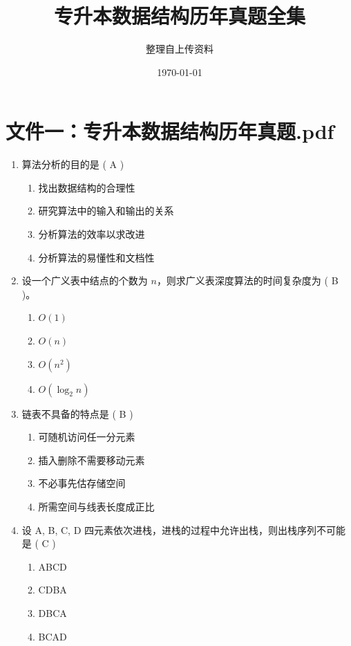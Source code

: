 \documentclass[12pt, a4paper]{article}
\title{\textbf{专升本数据结构历年真题全集}}
\author{整理自上传资料}
\date{\today}
\begin{document}
\maketitle
\tableofcontents
\newpage

\section{文件一：专升本数据结构历年真题.pdf}

\begin{enumerate}[label=\arabic*、]
    \item 算法分析的目的是 ( A )
    \begin{enumerate}
        \item 找出数据结构的合理性
        \item 研究算法中的输入和输出的关系
        \item 分析算法的效率以求改进
        \item 分析算法的易懂性和文档性
    \end{enumerate}

    \item 设一个广义表中结点的个数为 $n$，则求广义表深度算法的时间复杂度为 ( B )。
    \begin{enumerate}
        \item $O(1)$
        \item $O(n)$
        \item $O(n^2)$
        \item $O(\log_2 n)$
    \end{enumerate}

    \item 链表不具备的特点是 ( B )
    \begin{enumerate}
        \item 可随机访问任一分元素
        \item 插入删除不需要移动元素
        \item 不必事先估存储空间
        \item 所需空间与线表长度成正比
    \end{enumerate}

    \item 设 A, B, C, D 四元素依次进栈，进栈的过程中允许出栈，则出栈序列不可能是 ( C )
    \begin{enumerate}
        \item ABCD
        \item CDBA
        \item DBCA
        \item BCAD
    \end{enumerate}


\end{enumerate}
\end{document}
